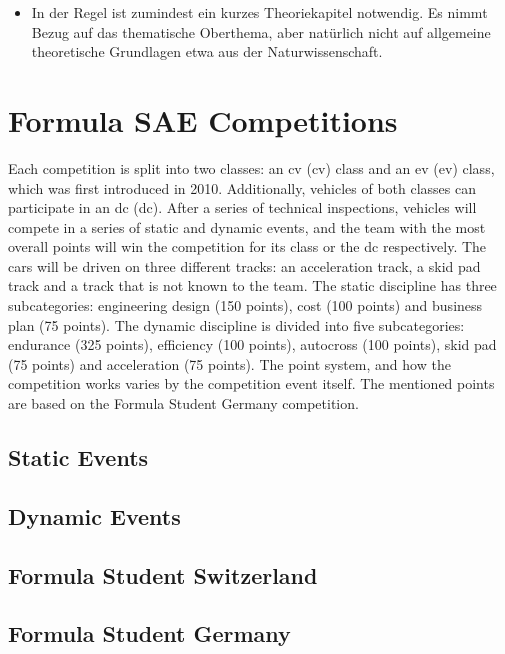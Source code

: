 \begin{itemize}
    \item In der Regel ist zumindest ein kurzes Theoriekapitel notwendig. Es nimmt Bezug auf das thematische Oberthema, aber natürlich nicht auf allgemeine theoretische Grundlagen etwa aus der Naturwissenschaft.
\end{itemize}

\section{Formula SAE Competitions}
Each competition is split into two classes: an \acrlong{cv} (\acrshort{cv}) class and an \acrlong{ev} (\acrshort{ev}) class, which was first introduced in 2010. Additionally, vehicles of both classes can participate in an \acrlong{dc} (\acrshort{dc}). After a series of technical inspections, vehicles will compete in a series of static and dynamic events, and the team with the most overall points will win the competition for its class or the \acrshort{dc} respectively. The cars will be driven on three different tracks: an acceleration track, a skid pad track and a track that is not known to the team. The static discipline has three subcategories: engineering design (150 points), cost (100 points) and business plan (75 points). The dynamic discipline is divided into five subcategories: endurance (325 points), efficiency (100 points), autocross (100 points), skid pad (75 points) and acceleration (75 points). The point system, and how the competition works varies by the competition event itself. The mentioned points are based on the Formula Student Germany competition.
\cite{amz_racing_history}

\subsection{Static Events}

\subsection{Dynamic Events}

\subsection{Formula Student Switzerland}

\subsection{Formula Student Germany}

